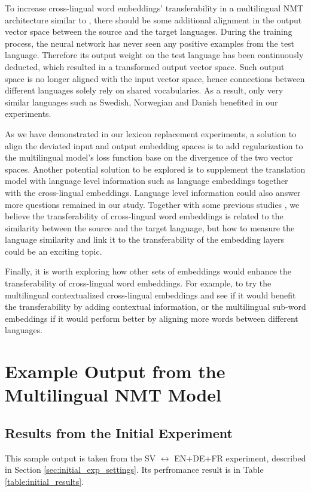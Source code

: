 \documentclass[thesis,fonts=libertine]{cluu}
\begin{document}
To increase cross-lingual word embeddings' transferability in a multilingual NMT architecture similar to \textcite{Johnson:2016aa}, there should be some additional alignment in the output vector space between the source and the target languages. During the training process, the neural network has never seen any positive examples from the test language. Therefore its output weight on the test language has been continuously deducted, which resulted in a transformed output vector space. Such output space is no longer aligned with the input vector space, hence connections between different languages solely rely on shared vocabularies. As a result, only very similar languages such as Swedish, Norwegian and Danish benefited in our experiments.

As we have demonstrated in our lexicon replacement experiments, a solution to align the deviated input and output embedding spaces is to add regularization to the multilingual model's loss function base on the divergence of the two vector spaces. Another potential solution to be explored is to supplement the translation model with language level information such as language embeddings \parencite{littell-etal-2017-uriel,malaviya-etal-2017-learning} together with the cross-lingual embeddings. Language level information could also answer more questions remained in our study. Together with some previous studies \parencite{Qi:2018aa,aji-etal-2020-neural}, we believe the transferability of cross-lingual word embeddings is related to the similarity between the source and the target language, but how to measure the language similarity and link it to the transferability of the embedding layers could be an exciting topic.

Finally, it is worth exploring how other sets of embeddings would enhance the transferability of cross-lingual word embeddings. For example, to try the multilingual contextualized cross-lingual embeddings \textcite{devlin-etal-2019-bert} and see if it would benefit the transferability by adding contextual information, or the multilingual sub-word embeddings \textcite{Heinzerling:2017aa} if it would perform better by aligning more words between different languages.

\appendix
\chapter{Example Output from the Multilingual NMT Model}
\label{chap:example_output}

\section{Results from the Initial Experiment}
This sample output is taken from the SV $\leftrightarrow$ EN+DE+FR experiment, described in Section \ref{sec:initial_exp_settings}. Its perfromance result is in Table \ref{table:initial_results}.
\end{document}
